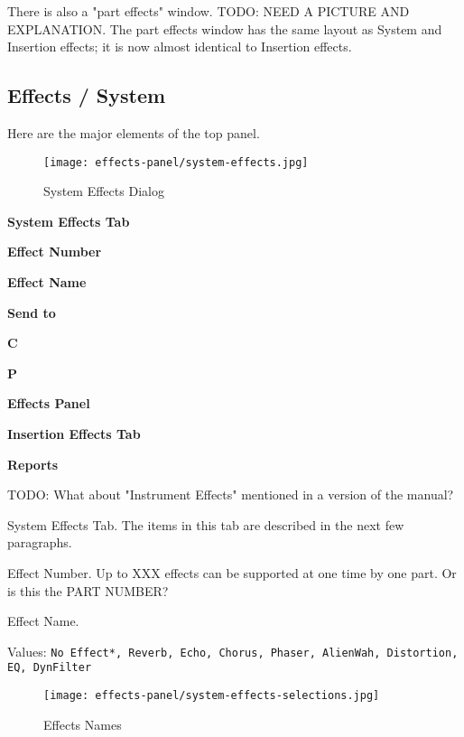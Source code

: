    There is also a "part effects" window.
   TODO: NEED A PICTURE AND EXPLANATION.
   The part effects window has the same layout as System and Insertion
   effects; it is now almost identical to Insertion effects.

\subsection{Effects / System}
\label{subsec:effects_system}

   Here are the major elements of the top panel.

\begin{figure}[H]
   \centering 
   \texttt{[image: effects-panel/system-effects.jpg]}
   \caption{System Effects Dialog}
   \label{fig:system_effects_dialog}
\end{figure}

   \begin{enumber}
      \item \textbf{System Effects Tab}
      \item \textbf{Effect Number}
      \item \textbf{Effect Name}
      \item \textbf{Send to}
      \item \textbf{C}
      \item \textbf{P}
      \item \textbf{Effects Panel}
      \item \textbf{Insertion Effects Tab}
      \item \textbf{Reports}
   \end{enumber}

   TODO:  What about "Instrument Effects" mentioned in a version of the manual?

   \setcounter{ItemCounter}{0}      %

   System Effects Tab.
   The items in this tab are described in the next few paragraphs.

   Effect Number.
   Up to XXX effects can be supported at one time by one part.
   Or is this the PART NUMBER?

   Effect Name.

   Values: \texttt{No Effect*, Reverb, Echo, Chorus, Phaser, AlienWah,
      Distortion, EQ, DynFilter}

\begin{figure}[H]
   \centering 
   \texttt{[image: effects-panel/system-effects-selections.jpg]}
   \caption{Effects Names}
   \label{fig:effects_names}
\end{figure}


